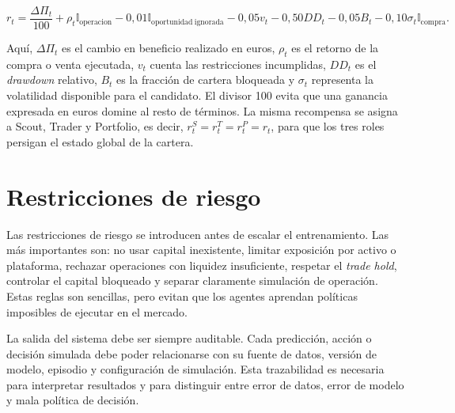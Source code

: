 \[
r_t = \frac{\Delta \Pi_t}{100}
+ \rho_t\mathbb{I}_{\mathrm{operacion}}
- 0{,}01\mathbb{I}_{\mathrm{oportunidad\ ignorada}}
- 0{,}05v_t
- 0{,}50DD_t
- 0{,}05B_t
- 0{,}10\sigma_t\mathbb{I}_{\mathrm{compra}}.
\]

Aquí, $\Delta \Pi_t$ es el cambio en beneficio realizado en euros, $\rho_t$ es el retorno de la compra o venta ejecutada, $v_t$ cuenta las restricciones incumplidas, $DD_t$ es el \textit{drawdown} relativo, $B_t$ es la fracción de cartera bloqueada y $\sigma_t$ representa la volatilidad disponible para el candidato. El divisor 100 evita que una ganancia expresada en euros domine al resto de términos. La misma recompensa se asigna a Scout, Trader y Portfolio, es decir, $r_t^S=r_t^T=r_t^P=r_t$, para que los tres roles persigan el estado global de la cartera.

\section{Restricciones de riesgo}

Las restricciones de riesgo se introducen antes de escalar el entrenamiento. Las más importantes son: no usar capital inexistente, limitar exposición por activo o plataforma, rechazar operaciones con liquidez insuficiente, respetar el \textit{trade hold}, controlar el capital bloqueado y separar claramente simulación de operación. Estas reglas son sencillas, pero evitan que los agentes aprendan políticas imposibles de ejecutar en el mercado.

La salida del sistema debe ser siempre auditable. Cada predicción, acción o decisión simulada debe poder relacionarse con su fuente de datos, versión de modelo, episodio y configuración de simulación. Esta trazabilidad es necesaria para interpretar resultados y para distinguir entre error de datos, error de modelo y mala política de decisión.
